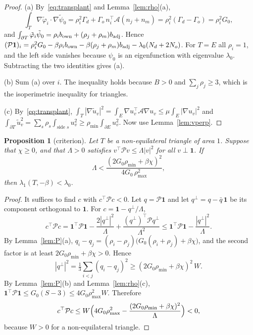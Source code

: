 \documentclass[11pt]{article}
\newtheorem{proposition}[theorem]{Proposition}
\theoremstyle{remark}
\newcommand{\E}{E}
\newcommand{\one}{\mathbf 1}
\begin{document}
\begin{proof}
(a) By~\eqref{eq:transplant} and Lemma~\ref{lem:rho}(a),
\[
 \int_T\nabla\tilde\varphi_i\cdot\nabla\tilde\psi_0
 =\rho_i^2\Gamma_d+\Gamma_o\,n_i^\top\mathcal A(n_j+n_m)=\rho_i^2(\Gamma_d-\Gamma_o)=\rho_i^2G_0,
\]
and $\int_{\partial T}\tilde\varphi_i\tilde\psi_0=\rho_ib_{\rm own}+(\rho_j+\rho_m)b_{\rm adj}$. Hence
$(\mathcal P\one)_i=\rho_i^2G_0-\beta\rho_ib_{\rm own}-\beta(\rho_j+\rho_m)b_{\rm adj}-\lambda_0(N_d+2N_o)$.
For $T=\E$ all $\rho_i=1$, and the left side vanishes because $\psi_0$ is an eigenfunction with
eigenvalue $\lambda_0$. Subtracting the two identities gives (a).

(b) Sum (a) over $i$. The inequality holds because $B>0$ and $\sum_j\rho_j\ge3$, which is the
isoperimetric inequality for triangles.

(c) By~\eqref{eq:transplant},
$\int_T|\nabla\tilde u_v|^2=\int_\E\nabla u_v^\top\mathcal A\nabla u_v\le\mu\int_\E|\nabla u_v|^2$ and
$\int_{\partial T}\tilde u_v^2=\sum_s\rho_s\int_{\text{side }s}u_v^2\ge\rho_{\min}\int_{\partial\E}u_v^2$.
Now use Lemma~\ref{lem:vperp}.
\end{proof}

\begin{proposition}[criterion]\label{prop:crit}
Let $T$ be a non-equilateral triangle of area $1$. Suppose that $\chi\ge0$, and that $\Lambda>0$ satisfies
$v^\top\mathcal Pv\le\Lambda|v|^2$ for all $v\perp\one$. If
\begin{equation}\label{eq:crit}
  \Lambda<\frac{(2G_0\rho_{\min}+\beta\chi)^2}{4G_0\,\rho_{\max}^2},
\end{equation}
then $\lambda_1(T,-\beta)<\lambda_0$.
\end{proposition}

\begin{proof}
It suffices to find $c$ with $c^\top\mathcal Pc<0$. Let $q=\mathcal P\one$ and let $q^\perp=q-\bar q\,\one$
be its component orthogonal to $\one$. For $c=\one-q^\perp/\Lambda$,
\[
 c^\top\mathcal Pc=\one^\top\mathcal P\one-\frac{2|q^\perp|^2}{\Lambda}
 +\frac{(q^{\perp})^\top\mathcal Pq^\perp}{\Lambda^2}
 \le\one^\top\mathcal P\one-\frac{|q^\perp|^2}{\Lambda}.
\]
By Lemma~\ref{lem:P}(a), $q_i-q_j=(\rho_i-\rho_j)\bigl(G_0(\rho_i+\rho_j)+\beta\chi\bigr)$, and the second
factor is at least $2G_0\rho_{\min}+\beta\chi>0$. Hence
\[
 |q^\perp|^2=\tfrac13\sum_{i<j}(q_i-q_j)^2\ge(2G_0\rho_{\min}+\beta\chi)^2\,W .
\]
By Lemma~\ref{lem:P}(b) and Lemma~\ref{lem:rho}(c),
$\one^\top\mathcal P\one\le G_0(S-3)\le4G_0\rho_{\max}^2W$. Therefore
\[
 c^\top\mathcal Pc\le W\Bigl(4G_0\rho_{\max}^2-\frac{(2G_0\rho_{\min}+\beta\chi)^2}{\Lambda}\Bigr)<0,
\]
because $W>0$ for a non-equilateral triangle.
\end{proof}
\end{document}
